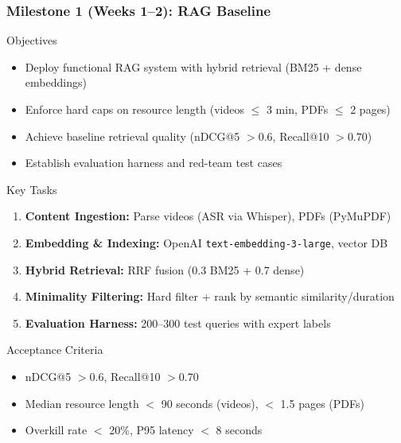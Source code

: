\documentclass[aspectratio=169]{beamer}
\begin{document}
\begin{frame}
\frametitle{Milestone 1 (Weeks 1--2): RAG Baseline}
\begin{block}{Objectives}
\begin{itemize}
\item Deploy functional RAG system with hybrid retrieval (BM25 + dense embeddings)
\item Enforce hard caps on resource length (videos $\leq$ 3 min, PDFs $\leq$ 2 pages)
\item Achieve baseline retrieval quality (nDCG@5 $> 0.6$, Recall@10 $> 0.70$)
\item Establish evaluation harness and red-team test cases
\end{itemize}
\end{block}

\begin{block}{Key Tasks}
\begin{enumerate}
\item \textbf{Content Ingestion:} Parse videos (ASR via Whisper), PDFs (PyMuPDF)
\item \textbf{Embedding \& Indexing:} OpenAI \texttt{text-embedding-3-large}, vector DB
\item \textbf{Hybrid Retrieval:} RRF fusion (0.3 BM25 + 0.7 dense)
\item \textbf{Minimality Filtering:} Hard filter + rank by semantic similarity/duration
\item \textbf{Evaluation Harness:} 200--300 test queries with expert labels
\end{enumerate}
\end{block}

\begin{block}{Acceptance Criteria}
\begin{itemize}
\item nDCG@5 $> 0.6$, Recall@10 $> 0.70$
\item Median resource length $<$ 90 seconds (videos), $<$ 1.5 pages (PDFs)
\item Overkill rate $<$ 20\%, P95 latency $<$ 8 seconds
\end{itemize}
\end{block}
\end{frame}
\end{document}
